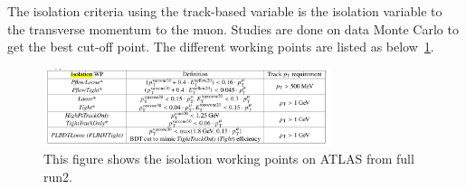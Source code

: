 The isolation criteria using the track-based variable is the isolation variable to the transverse momentum to the muon. Studies are done on data Monte Carlo to get the best cut-off point. The different working points are listed as below~\ref{fig:isolationWP}.


\begin{figure}[!htb]
    \begin{center}
        \includegraphics[width=0.75\textwidth]{figures/common_ana/Isolation}
        \caption{
            This figure shows the isolation working points on ATLAS from full run2\cite{Aad:2746302}.}
        \label{fig:isolationWP}
    \end{center}
\end{figure}

